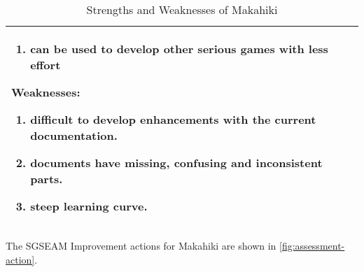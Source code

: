 \begin{table}[ht!]
\begin{tabular}{|P{0.15\columnwidth}|P{0.78\columnwidth}|}
\begin{enumerate}[label={}, nosep, leftmargin=*]
    \item can be used to develop other serious games with less effort
    \end{enumerate} 
    Weaknesses:
    \begin{enumerate}[nosep, leftmargin=*]
    \item difficult to develop enhancements with the current documentation.
    \item documents have missing, confusing and inconsistent parts.
    \item steep learning curve. 
    \end{enumerate} \\
    \hline
  \end{tabular}
  \caption{Strengths and Weaknesses of Makahiki}
  \label{table:assessment-result}
\end{table}

\clearpage

The SGSEAM Improvement actions for Makahiki are shown in \autoref{fig:assessment-action}.

